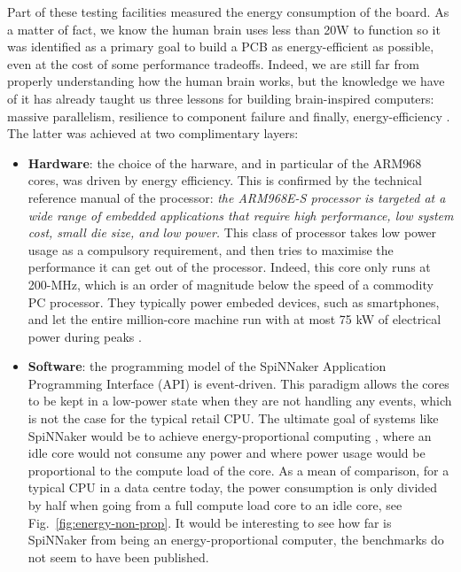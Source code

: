 Part of these testing facilities measured the energy consumption of the board. As a matter of fact, we know the human brain uses less than 20W to function so it was identified as a primary goal to build a PCB as energy-efficient as possible, even at the cost of some performance tradeoffs. Indeed, we are still far from properly understanding how the human brain works, but the knowledge we have of it has already taught us three lessons for building brain-inspired computers: massive parallelism, resilience to component failure and finally, energy-efficiency \citep{bic}. The latter was achieved at two complimentary layers:

\begin{itemize}
\item \textbf{Hardware}: the choice of the harware, and in particular of the ARM968 cores, was driven by energy efficiency. This is confirmed by the technical reference manual of the processor: \textit{the ARM968E-S processor is targeted at a wide range of embedded applications that require high performance, low system cost, small die size, and low power.} \cite{arm968} This class of processor takes low power usage as a compulsory requirement, and then tries to maximise the performance it can get out of the processor. Indeed, this core only runs at 200-MHz, which is an order of magnitude below the speed of a commodity PC processor. They typically power embeded devices, such as smartphones, and let the entire million-core machine run with at most 75 kW of electrical power during peaks \cite{spinnaker}. %

\item \textbf{Software}: the programming model of the SpiNNaker Application Programming Interface (API) is event-driven. This paradigm allows the cores to be kept in a low-power state when they are not handling any events, which is not the case for the typical retail CPU. The ultimate goal of systems like SpiNNaker would be to achieve energy-proportional computing \cite{energy-prop}, where an idle core would not consume any power and where power usage would be proportional to the compute load of the core. As a mean of comparison, for a typical CPU in a data centre today, the power consumption is only divided by half when going from a full compute load core to an idle core, see Fig.~\ref{fig:energy-non-prop}. It would be interesting to see how far is SpiNNaker from being an energy-proportional computer, the benchmarks do not seem to have been published.
\end{itemize}
 
